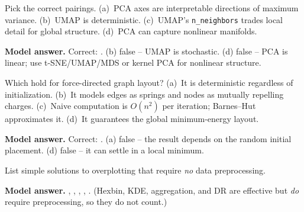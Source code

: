 \begin{qbox}
Pick the correct pairings.
(a)~PCA axes are interpretable directions of maximum variance.
(b)~UMAP is deterministic.
(c)~UMAP's \texttt{n\_neighbors} trades local detail for global structure.
(d)~PCA can capture nonlinear manifolds.

\medskip\noindent\textbf{Model answer.} Correct: .
(b) false -- UMAP is stochastic. (d) false -- PCA is linear; use t-SNE/UMAP/MDS
or kernel PCA for nonlinear structure.
\end{qbox}

\begin{qbox}
Which hold for force-directed graph layout?
(a)~It is deterministic regardless of initialization.
(b)~It models edges as springs and nodes as mutually repelling charges.
(c)~Naive computation is $O(n^2)$ per iteration; Barnes--Hut approximates it.
(d)~It guarantees the global minimum-energy layout.

\medskip\noindent\textbf{Model answer.} Correct: .
(a) false -- the result depends on the random initial placement. (d) false --
it can settle in a local minimum.
\end{qbox}

\begin{qbox}
List simple solutions to overplotting that require \emph{no} data preprocessing.

\medskip\noindent\textbf{Model answer.}
, , ,
, . (Hexbin, KDE, aggregation, and
DR are effective but \emph{do} require preprocessing, so they do not count.)
\end{qbox}

